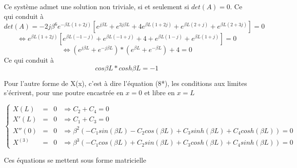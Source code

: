 \documentclass[a4paper,10pt]{article}
\begin{document}
Ce système admet une solution non triviale, si et seulement si \begin{math} det(A)=0 \end{math}. Ce qui conduit à 
\begin{equation} det(A) = -2j\beta^6 e^{-\beta L(1+2j)} [e^{j\beta L} + e^{3j\beta L} + 4e^{\beta L(1+2j)} + e^{\beta L (2+j)} + e^{\beta L(2+3j)} ] = 0     \end{equation}
\begin{equation} \iff e^{\beta L(1+2j)} [ e^{\beta L (-1-j)} + e^{\beta L (-1+j)} + 4 + e^{\beta L(1-j)} + e^{\beta L(1+j)} ] = 0  \end{equation}
\begin{equation}\iff (e^{j\beta L} + e^{-j\beta L})*(e^{\beta L}+e^{-\beta L})+4 = 0  \end{equation}
Ce qui conduit à 
\begin{equation} cos\beta L * cosh \beta L = -1  \end{equation}


Pour l'autre forme de X(x), c'est à dire l'équation (8*), les conditions aux limites s'écrivent, pour une poutre encastrée en \begin{math} x=0 \end{math} et libre en \begin{math} x=L \end{math}



\begin{equation}
	\left\{
		\begin{aligned}
			X(L) 	&=& 	0  &\Rightarrow  C_2   +  C_4 =  0 \\
			X'(L) 	&=&	0  &\Rightarrow  C_1 + C_3  =  0\\
			X''(0)	&=&	0  &\Rightarrow  \beta^2 ( -C_1 sin(\beta L)  - C_2 cos(\beta L)  +  C_3 sinh(\beta L)  + C_4 cosh(\beta L) ) =  0  \\
			X^{(3)} &=& 0  &\Rightarrow  \beta^3 ( -C_1 cos(\beta L)  + C_2 sin(\beta L)  +  C_3 cosh(\beta L)  + C_4 sinh(\beta L) ) =  0  
		\end{aligned}
	\right.
\end{equation}


Ces équations se mettent sous forme matricielle
\end{document}
